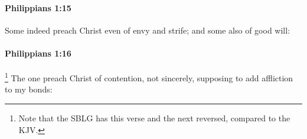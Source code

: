 		\paragraph{Philippians 1:15} %
			\label{PHILIPPIANS-1-15}

			Some indeed preach Christ even of envy and strife; and some also of good will:

			\begin{framed}
			\scriptsize
				\begin{compactdesc}
					\item[SBLG] 
				\end{compactdesc}
			\end{framed}

		\paragraph{Philippians 1:16} %
			\label{PHILIPPIANS-1-16}

				\footnote{%
					Note that the SBLG has this verse and the next reversed, compared to the KJV.
					}%
			The one preach Christ of contention, not sincerely, supposing to add affliction to my bonds:

